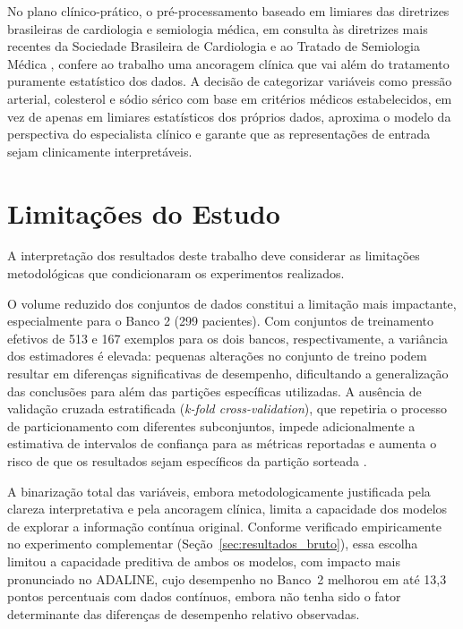 No plano clínico-prático, o pré-processamento baseado em limiares das diretrizes brasileiras de cardiologia e semiologia médica, em consulta às diretrizes mais recentes da Sociedade Brasileira de Cardiologia \cite{brandao2025,rached2025,rohde2018} e ao Tratado de Semiologia Médica \cite{porto2019}, confere ao trabalho uma ancoragem clínica que vai além do tratamento puramente estatístico dos dados. A decisão de categorizar variáveis como pressão arterial, colesterol e sódio sérico com base em critérios médicos estabelecidos, em vez de apenas em limiares estatísticos dos próprios dados, aproxima o modelo da perspectiva do especialista clínico e garante que as representações de entrada sejam clinicamente interpretáveis.

\section{Limitações do Estudo}

A interpretação dos resultados deste trabalho deve considerar as limitações metodológicas que condicionaram os experimentos realizados.

O volume reduzido dos conjuntos de dados constitui a limitação mais impactante, especialmente para o Banco 2 (299 pacientes). Com conjuntos de treinamento efetivos de 513 e 167 exemplos para os dois bancos, respectivamente, a variância dos estimadores é elevada: pequenas alterações no conjunto de treino podem resultar em diferenças significativas de desempenho, dificultando a generalização das conclusões para além das partições específicas utilizadas. A ausência de validação cruzada estratificada (\textit{k-fold cross-validation}), que repetiria o processo de particionamento com diferentes subconjuntos, impede adicionalmente a estimativa de intervalos de confiança para as métricas reportadas e aumenta o risco de que os resultados sejam específicos da partição sorteada \cite{pedregosa2011}.

A binarização total das variáveis, embora metodologicamente justificada pela clareza interpretativa e pela ancoragem clínica, limita a capacidade dos modelos de explorar a informação contínua original. Conforme verificado empiricamente no experimento complementar (Seção~\ref{sec:resultados_bruto}), essa escolha limitou a capacidade preditiva de ambos os modelos, com impacto mais pronunciado no ADALINE, cujo desempenho no Banco~2 melhorou em até 13,3 pontos percentuais com dados contínuos, embora não tenha sido o fator determinante das diferenças de desempenho relativo observadas.

